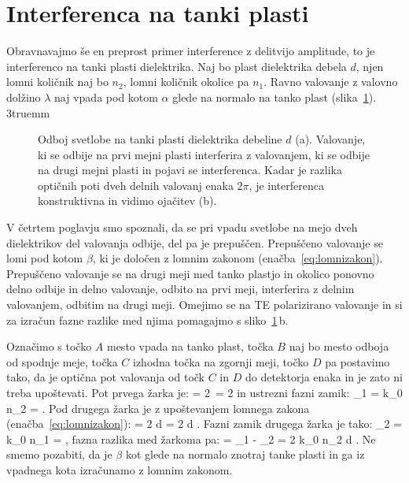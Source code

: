 \section{Interferenca na tanki plasti}
Obravnavajmo še en preprost primer interference z delitvijo amplitude, to je 
interferenco na tanki plasti dielektrika. Naj bo plast dielektrika
debela $d$, njen lomni količnik naj bo $n_2$, lomni količnik okolice
pa $n_1$. Ravno valovanje z valovno dolžino $\lambda$ naj vpada pod kotom
$\alpha$ glede na normalo na tanko plast (slika~\ref{fig:06_plast}).
\vglue3truemm
\begin{figure}[ht]
\centering
\def\svgwidth{130truemm} 

\caption{Odboj svetlobe na tanki plasti dielektrika debeline $d$ (a). Valovanje,
ki se odbije na prvi mejni plasti interferira z valovanjem, ki se odbije na 
drugi mejni plasti in pojavi se interferenca.
Kadar je razlika optičnih poti dveh delnih valovanj enaka $2\pi$,
je interferenca konstruktivna in vidimo ojačitev (b). 
}
\label{fig:06_plast}
\end{figure}

V četrtem poglavju smo spoznali, da se pri vpadu svetlobe na mejo dveh dielektrikov
del valovanja odbije, del pa je prepuščen. Prepuščeno valovanje se lomi pod kotom
$\beta$, ki je določen z lomnim zakonom (enačba~\ref{eq:lomnizakon}). Prepuščeno valovanje
se na drugi meji med tanko plastjo in okolico ponovno delno odbije in delno valovanje, 
odbito na prvi meji, interferira z delnim valovanjem, odbitim na drugi meji. Omejimo
se na TE polarizirano valovanje in si za
izračun fazne razlike med njima pomagajmo s sliko~\ref{fig:06_plast}\,b.

Označimo s točko $A$ mesto vpada na tanko plast, točka $B$ naj bo mesto odboja 
od spodnje meje, točka $C$ izhodna točka na zgornji meji, točko $D$ pa postavimo
tako, da je optična pot valovanja od točk $C$ in $D$ do detektorja enaka in je 
zato ni treba upoštevati. Pot prvega žarka je:
\beq
{}= 2\, = 2 
\label{eq:06_30}
\eeq
in ustrezni fazni zamik:
\beq
\phi_1 = k_0 n_2  = .
\label{eq:06_31}
\eeq
Pod drugega žarka je z upoštevanjem lomnega zakona (enačba~\ref{eq:lomnizakon}):
\beq
{} = 2 d \tan \beta \sin \alpha = 2 d \tan \beta {}.
\label{eq:06_32}
\eeq
Fazni zamik drugega žarka je tako:
\beq
\phi_2 = k_0 n_1  = ,
\label{eq:06_33}
\eeq
fazna razlika med žarkoma pa:
\beq
\phi  = \phi_1 - \phi_2 = 2 k_0 n_2 d \cos \beta.
\label{eq:06_34}
\eeq
Ne smemo pozabiti, da je $\beta$ kot glede na normalo znotraj tanke plasti in ga iz 
vpadnega kota izračunamo z lomnim zakonom. 

